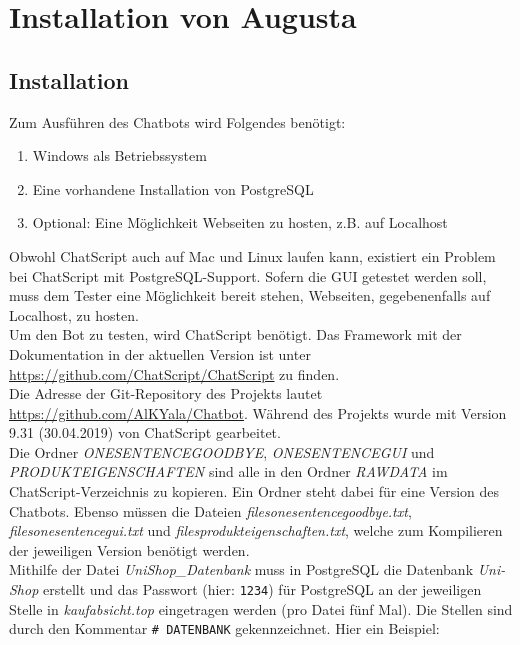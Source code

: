 \chapter{Installation von Augusta}
\label{sec:InstallationAugusta}

\section{Installation}
\label{sec:Installation}

Zum Ausführen des Chatbots wird Folgendes benötigt:

\begin{enumerate}
\item {Windows als Betriebssystem}
\item {Eine vorhandene Installation von PostgreSQL}
\item {Optional: Eine Möglichkeit Webseiten zu hosten, z.B. auf Localhost}
\end{enumerate}

Obwohl ChatScript auch auf Mac und Linux laufen kann, existiert ein Problem bei ChatScript mit PostgreSQL-Support. Sofern die GUI getestet werden soll, muss dem Tester eine Möglichkeit bereit stehen, Webseiten, gegebenenfalls auf Localhost, zu hosten. \\
Um den Bot zu testen, wird ChatScript benötigt. Das Framework mit der Dokumentation in der aktuellen Version ist unter \url{https://github.com/ChatScript/ChatScript} zu finden.\\
Die Adresse der Git-Repository des Projekts lautet \url{https://github.com/AlKYala/Chatbot}. Während des Projekts wurde mit Version 9.31 (30.04.2019) von ChatScript gearbeitet.\\
Die Ordner \textit{ONESENTENCEGOODBYE}, \textit{ONESENTENCEGUI} und \textit{PRODUKTEIGENSCHAFTEN} sind alle in den Ordner \textit{RAWDATA} im ChatScript-Verzeichnis zu kopieren. Ein Ordner steht dabei für eine Version des Chatbots. Ebenso müssen die Dateien \textit{filesonesentencegoodbye.txt}, \textit{filesonesentencegui.txt} und \textit{filesprodukteigenschaften.txt}, welche zum Kompilieren der jeweiligen Version benötigt werden.\\
Mithilfe der Datei \textit{UniShop\_Datenbank} muss in PostgreSQL die Datenbank \textit{Uni-Shop} erstellt und das Passwort (hier: \lstinline|1234|) für PostgreSQL an der jeweiligen Stelle in \textit{kaufabsicht.top} eingetragen werden (pro Datei fünf Mal). Die Stellen sind durch den Kommentar \lstinline|# DATENBANK| gekennzeichnet. Hier ein Beispiel:

